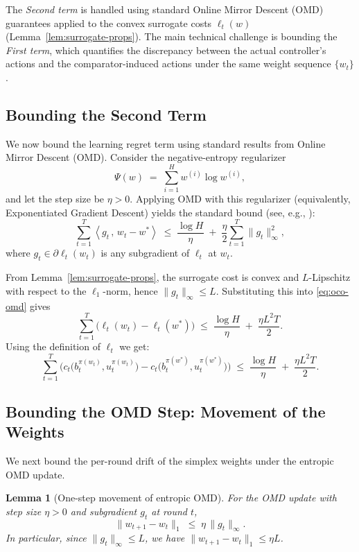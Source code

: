 \documentclass[11pt]{article}
\newtheorem{Thm:Lemma}{Lemma}
\begin{document}
The \emph{Second term} is handled using standard Online Mirror Descent (OMD) guarantees applied to the convex surrogate costs \(\ell_t(w)\) (Lemma~\ref{lem:surrogate-props}).  
The main technical challenge is bounding the \emph{First term}, which quantifies the discrepancy between the actual controller’s actions and the comparator-induced actions under the same weight sequence \(\{w_t\}\).


\subsection{Bounding the Second Term}

We now bound the learning regret term using standard results from Online Mirror Descent (OMD).  
Consider the negative-entropy regularizer
\[
\Psi(w) \;=\; \sum_{i=1}^H w^{(i)} \log w^{(i)},
\]
and let the step size be \(\eta > 0\).  
Applying OMD with this regularizer (equivalently, Exponentiated Gradient Descent) yields the standard bound (see, e.g., \cite{orabona_modern_2023}):
\begin{equation}
\label{eq:oco-omd}
\sum_{t=1}^T 
\left\langle 
g_t
\,,\, 
w_t - w^*
\right\rangle
\;\le\;
\frac{\log H}{\eta}
\;+\; \frac{\eta}{2}\sum_{t=1}^T \|g_t\|_\infty^2,
\end{equation}
where \(g_t \in \partial \ell_t(w_t)\) is any subgradient of \(\ell_t\) at \(w_t\).   

From Lemma~\ref{lem:surrogate-props}, the surrogate cost is convex and \(L\)-Lipschitz with respect to the \(\ell_1\)-norm, hence \(\|g_t\|_\infty \le L\).  
Substituting this into \eqref{eq:oco-omd} gives
\[
\sum_{t=1}^T \bigl(\ell_t(w_t) - \ell_t(w^*)\bigr)
\;\le\;
\frac{\log H}{\eta}
\;+\; \frac{\eta L^2 T}{2}.
\]
Using the definition of $\ell_t$ we get:
\begin{equation}
\label{eq:oco-omd-2}
\sum_{t=1}^T \Big( c_t\big(b_t^{\pi(w_t)},u_t^{\pi(w_t)}\big) - c_t\big(b_t^{\pi(w^*)}, u_t^{\pi(w^*)}\big)\Big)
    \;\le\;
\frac{\log H}{\eta}
\;+\; \frac{\eta L^2 T}{2}.
\end{equation}

\subsection{Bounding the OMD Step: Movement of the Weights}

We next bound the per-round drift of the simplex weights under the entropic OMD update.

\begin{Thm:Lemma}[One-step movement of entropic OMD]
\label{lem:omd-move}
For the OMD update with step size \(\eta > 0\) and subgradient \(g_t\) at round \(t\),
\[
\|w_{t+1}-w_t\|_1 \;\le\; \eta\,\|g_t\|_\infty.
\]
In particular, since \(\|g_t\|_\infty \le L\), we have \(\|w_{t+1}-w_t\|_1 \le \eta L\).
\end{Thm:Lemma}
\end{document}
